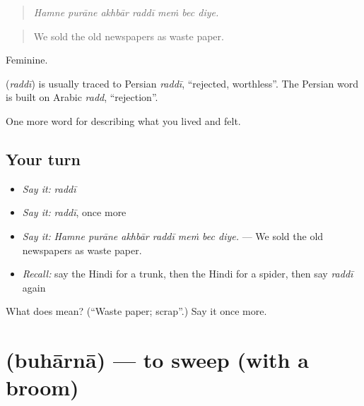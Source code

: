 \begin{quote}
      
\end{quote}

\begin{quote}
\emph{Hamne purāne akhbār raddī meṁ bec diye.}
\end{quote}

\begin{quote}
We sold the old newspapers as waste paper.
\end{quote}

Feminine.

\begin{cousinweb}
\textbf{} (\emph{raddī}) is usually traced to Persian \emph{raddī}, \textquotedblleft{}rejected, worthless\textquotedblright{}. The Persian word is built on Arabic \emph{radd}, \textquotedblleft{}rejection\textquotedblright{}.
\end{cousinweb}

\begin{grammarlens}[title={What you've built}]
One more word for describing what you lived and felt.
\end{grammarlens}

\subsection*{Your turn}
\begin{itemize}
\raggedright
  \item \emph{Say it:} \emph{raddī}
  \item \emph{Say it:} \emph{raddī}, once more
  \item \emph{Say it:} \emph{Hamne purāne akhbār raddī meṁ bec diye.} — We sold the old newspapers as waste paper.
  \item \emph{Recall:} say the Hindi for a trunk, then the Hindi for a spider, then say \emph{raddī} again
\end{itemize}

\begin{tcolorbox}[breakable,colback=teal!4,colframe=teal!35!black,title={Before you move on}]
What does  mean? (\textquotedblleft{}Waste paper; scrap\textquotedblright{}.) Say it once more.
\end{tcolorbox}
\section[\texorpdfstring{\hi{बुहारना} (buhārnā)}{बुहारना (buhārnā)}]{ (buhārnā) — to sweep (with a broom)}

